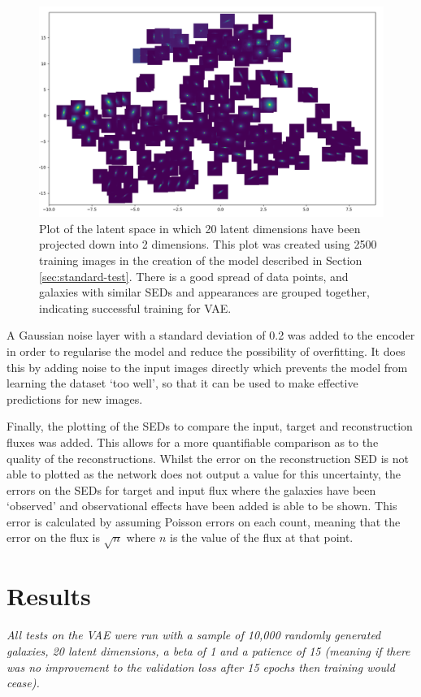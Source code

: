 \documentclass[fleqn,usenatbib]{mnras}
\begin{document}
\begin{figure}
	\includegraphics[width=2\columnwidth]{Figures/t_SNE.png}
    \caption{Plot of the latent space in which 20 latent dimensions have been projected down into 2 dimensions. This plot was created using 2500 training images in the creation of the model described in Section \ref{sec:standard-test}. There is a good spread of data points, and galaxies with similar SEDs and appearances are grouped together, indicating successful training for VAE.}
    \label{fig:t-SNE}
\end{figure} 

A Gaussian noise layer with a standard deviation of 0.2 was added to the encoder in order to regularise the model and reduce the possibility of overfitting. It does this by adding noise to the input images directly which prevents the model from learning the dataset ‘too well', so that it can be used to make effective predictions for new images.

Finally, the plotting of the SEDs to compare the input, target and reconstruction fluxes was added. This allows for a more quantifiable comparison as to the quality of the reconstructions. Whilst the error on the reconstruction SED is not able to plotted as the network does not output a value for this uncertainty, the errors on the SEDs for target and input flux where the galaxies have been ‘observed' and observational effects have been added is able to be shown. This error is calculated by assuming Poisson errors on each count, meaning that the error on the flux is $\sqrt{n}$ where $n$ is the value of the flux at that point.

\section{Results}
\label{sec:results}
\textit{All tests on the VAE were run with a sample of 10,000 randomly generated galaxies, 20 latent dimensions, a beta of 1 and a patience of 15 (meaning if there was no improvement to the validation loss after 15 epochs then training would cease).}
\end{document}
